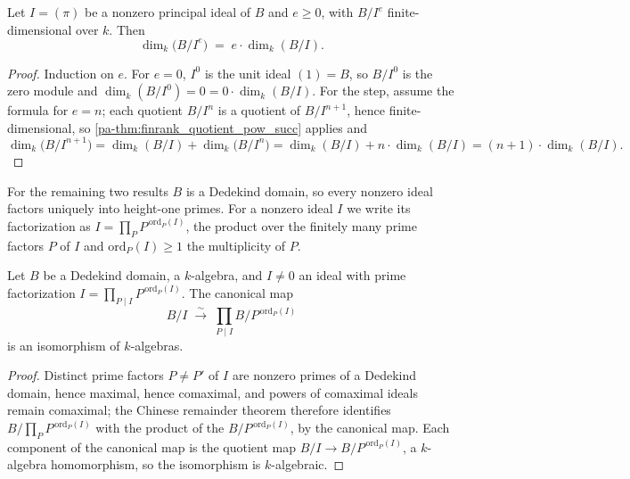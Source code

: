 \begin{theorem}
  \label{pa-thm:finrank_quotient_span_pow}
  \leanok

  Let \(I = (\pi)\) be a nonzero principal ideal of \(B\) and \(e \ge 0\), with \(B/I^e\)
  finite-dimensional over \(k\). Then
  \[
    \dim_k\bigl(B/I^e\bigr) \;=\; e \cdot \dim_k(B/I) .
  \]
\end{theorem}
\begin{proof}
  \leanok
  Induction on \(e\). For \(e = 0\), \(I^0\) is the unit ideal \((1) = B\), so \(B/I^0\) is the
  zero module and \(\dim_k(B/I^0) = 0 = 0 \cdot \dim_k(B/I)\). For the step, assume the formula
  for \(e = n\); each quotient \(B/I^n\) is a quotient of \(B/I^{n+1}\), hence
  finite-dimensional, so \ref{pa-thm:finrank_quotient_pow_succ} applies and
  \[
    \dim_k\bigl(B/I^{n+1}\bigr) = \dim_k(B/I) + \dim_k\bigl(B/I^n\bigr)
      = \dim_k(B/I) + n \cdot \dim_k(B/I) = (n+1) \cdot \dim_k(B/I) .
  \]
\end{proof}

For the remaining two results \(B\) is a Dedekind domain, so every nonzero ideal factors
uniquely into height-one primes. For a nonzero ideal \(I\) we write its factorization as
\(I = \prod_P P^{\,\mathrm{ord}_P(I)}\), the product over the finitely many prime factors \(P\)
of \(I\) and \(\mathrm{ord}_P(I) \ge 1\) the multiplicity of \(P\).

\begin{definition}
  \label{pa-def:quotAlgEquivPiFactors}
  \leanok

  Let \(B\) be a Dedekind domain, a \(k\)-algebra, and \(I \neq 0\) an ideal with prime
  factorization \(I = \prod_{P \mid I} P^{\,\mathrm{ord}_P(I)}\). The canonical map
  \[
    B/I \;\xrightarrow{\ \sim\ }\; \prod_{P \mid I} B/P^{\,\mathrm{ord}_P(I)}
  \]
  is an isomorphism of \(k\)-algebras.
\end{definition}
\begin{proof}
  \leanok
  Distinct prime factors \(P \neq P'\) of \(I\) are nonzero primes of a Dedekind domain,
  hence maximal, hence comaximal, and powers of comaximal ideals remain comaximal; the
  Chinese remainder theorem therefore identifies \(B/\prod_P P^{\,\mathrm{ord}_P(I)}\)
  with the product of the \(B/P^{\,\mathrm{ord}_P(I)}\), by the canonical map. Each
  component of the canonical map is the quotient map
  \(B/I \to B/P^{\,\mathrm{ord}_P(I)}\), a \(k\)-algebra homomorphism, so the
  isomorphism is \(k\)-algebraic.
\end{proof}

